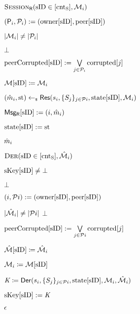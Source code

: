 \begin{figure}[h!]
{{\begin{minipage}[t]{0.6\textwidth}
\underline{$\GakeResO(\sID \in [\cntS], \GakeIniMesSet[{i}] )$} 
\begin{nicodemus}
	\item $(\GIni,\PartySet_{i}) := (\owner[\sID],\peer[\sID])$
	\item \pcif $|\GakeIniMesSet[{i}]| \neq |\PartySet_{i}|$ 
	\item \quad  \pcreturn $\bot$ 
	\item $\peercorrupted[\sID] := \bigvee\limits_{ j \in \PartySet_{i}} \corrupted[j]$
	\item $\GIniMesSet[\sID] \coloneqq  \GakeIniMesSet[{i}]$ \label{line:gake-problem-a}
	\item $(\GakeResMes_{i}, \Gstate) \getsr \GakeRes(\GakeSk[i], \{\GakePk[j]\}_{j \in \PartySet{i}}, \Gstates[\GakeResUsID], \GakeIniMesSet[{i}])$
	\item $\GResMes[\sID]:=({i},\GakeResMes_{i})$
	\item $\Gstates[\sID]:= \Gstate$
	\item \pcreturn $\GakeResMes_{i}$ \\
\end{nicodemus}
\underline{$\GakeDerO(\GakeResUsID \in [\cntS],  \GakeResMesSet[{i}])$} 
\begin{nicodemus}
	\item \pcif $\skeys[\GakeResUsID] \neq \bot$  
	\item \quad \pcreturn $\bot$
	\item $({i},\PartySet{i}) := (\owner[\GakeResUsID],\peer[\GakeResUsID])$
	\item \pcif $|\GakeResMesSet[{i}]| \neq |\PartySet{i}|$ \pcreturn $\bot$
	\item $\peercorrupted[\sID] := \bigvee\limits_{ j \in \PartySet{i}} \corrupted[j]$
	\item $\GResMesSet[\sID] \coloneqq \GakeResMesSet[{i}]$ \label{line:gake-problem-b}
	\item $\GakeIniMesSet[{i}] \coloneqq \GIniMesSet[\sID]$
	\item $\GakeSessKey \coloneqq \GakeDer(\GakeSk[{i}], \{\GakePk[j]\}_{j \in \PartySet{i}}, \Gstates[\GakeResUsID], \GakeIniMesSet[{i}], \GakeResMesSet[{i}])$
	\item $\skeys[\GakeResUsID] :=  \GakeSessKey$
	\item \pcreturn $\emptystr$\\
\end{nicodemus}
\end{minipage}
\begin{minipage}[t]{0.4\textwidth}


\end{minipage}}}
\end{figure}
